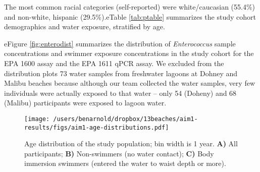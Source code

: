 \documentclass[12pt]{article}\usepackage[]{graphicx}\usepackage[]{color}
\begin{document}
The most common racial categories (self-reported) were white/caucasian (55.4\%) and non-white, hispanic (29.5\%).eTable \ref{tab:ptable} summarizes the study cohort demographics and water exposure, stratified by age.

eFigure \ref{fig:enterodist} summarizes the distribution of \emph{Enterococcus} sample concentrations and swimmer exposure concentrations in the study cohort for the EPA 1600 assay and the EPA 1611 qPCR assay. We excluded from the distribution plots 73 water samples from freshwater lagoons at Dohney and Malibu beaches because although our team collected the water samples, very few individuals were actually exposed to that water -- only 54 (Doheny) and 68 (Malibu) participants were exposed to lagoon water.


\begin{figure}
\begin{center}
\texttt{[image: /users/benarnold/dropbox/13beaches/aim1-results/figs/aim1-age-distributions.pdf]}
\caption{Age distribution of the study population; bin width is 1 year. \textbf{A)} All participants; \textbf{B)} Non-swimmers (no water contact); \textbf{C)} Body immersion swimmers (entered the water to waist depth or more). \label{fig:agedist}}
\end{center}
\end{figure}
\end{document}
